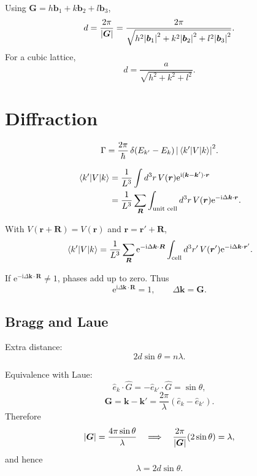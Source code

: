 \documentclass[11pt,a4paper]{article}
\newcommand{\ii}{\mathrm{i}}
\newcommand{\ee}{\mathrm{e}}
\newcommand{\vect}[1]{\boldsymbol{#1}}
\begin{document}
Using $\vect G=h\vect b_1+k\vect b_2+l\vect b_3$,
\[
  d=
  \frac{2\pi}{\abs{\vect G}}
  =
  \frac{2\pi}
  {\sqrt{h^2\abs{\vect b_1}^2+k^2\abs{\vect b_2}^2+l^2\abs{\vect b_3}^2}}.
\]
For a cubic lattice,
\[
  d=\frac{a}{\sqrt{h^2+k^2+l^2}}.
\]

\section{Diffraction}

\[
  \Gamma =
  \frac{2\pi}{\hbar}\,
  \delta(E_{k'}-E_k)\,
  \abs{\mel{k'}{V}{k}}^2.
\]

\[
\begin{aligned}
\mel{k'}{V}{k}
&=
\frac{1}{L^3}
\int d^3r\, V(\vect r)
\ee^{\ii(\vect k-\vect k')\cdot \vect r} \\
&=
\frac{1}{L^3}\sum_{\vect R}
\int_{\text{unit cell}} d^3r\, V(\vect r)
\ee^{-\ii\Delta\vect k\cdot \vect r}.
\end{aligned}
\]

With $V(\vect r+\vect R)=V(\vect r)$ and $\vect r=\vect r'+\vect R$,
\[
  \mel{k'}{V}{k}
  =
  \frac{1}{L^3}
  \sum_{\vect R}
  \ee^{-\ii\Delta\vect k\cdot \vect R}
  \int_{\text{cell}} d^3r'\,V(\vect r')
  \ee^{-\ii\Delta\vect k\cdot \vect r'}.
\]

If $\ee^{-\ii\Delta\vect k\cdot \vect R}\ne 1$, phases add up to zero. Thus
\[
  \ee^{\ii\Delta\vect k\cdot \vect R}=1,
  \qquad
  \boxed{\Delta\vect k=\vect G}.
\]

\subsection{Bragg and Laue}

Extra distance:
\[
  2d\sin\theta=n\lambda.
\]

\begin{center}
\end{center}

Equivalence with Laue:
\[
  \hat e_k\cdot \hat G=-\hat e_{k'}\cdot \hat G=\sin\theta,
\]
\[
  \vect G=\vect k-\vect k'
  =
  \frac{2\pi}{\lambda}(\hat e_k-\hat e_{k'}).
\]
Therefore
\[
  \abs{\vect G}=\frac{4\pi\sin\theta}{\lambda}
  \quad \Longrightarrow \quad
  \frac{2\pi}{\abs{\vect G}}(2\sin\theta)=\lambda,
\]
and hence
\[
  \lambda=2d\sin\theta.
\]
\end{document}
